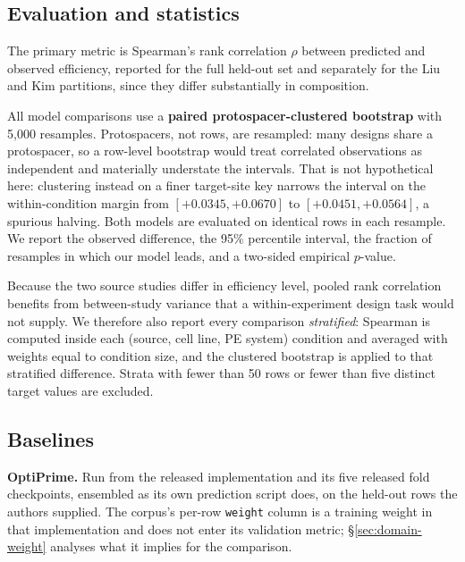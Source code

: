 \documentclass[11pt]{article}
\begin{document}
\subsection{Evaluation and statistics}

The primary metric is Spearman's rank correlation $\rho$ \citep{spearman1904} between
predicted and observed efficiency,
reported for the full held-out set and separately for the Liu and Kim partitions, since
they differ substantially in composition.

All model comparisons use a \textbf{paired protospacer-clustered bootstrap}
\citep{efron1993,cameron2008} with 5{,}000 resamples. Protospacers, not rows, are
resampled: many designs share a protospacer, so a row-level bootstrap would treat
correlated observations as independent and materially understate the intervals. That is
not hypothetical here: clustering instead on a finer target-site key narrows the
interval on the within-condition margin from $[+0.0345,+0.0670]$ to
$[+0.0451,+0.0564]$, a spurious halving. Both models are evaluated on identical rows in each resample.
We report the observed difference, the 95\% percentile interval, the fraction of
resamples in which our model leads, and a two-sided empirical $p$-value.

Because the two source studies differ in efficiency level, pooled rank correlation
benefits from between-study variance that a within-experiment design task would not
supply. We therefore also report every comparison \emph{stratified}: Spearman is
computed inside each (source, cell line, PE system) condition and averaged with weights
equal to condition size, and the clustered bootstrap is applied to that stratified
difference. Strata with fewer than 50 rows or fewer than five distinct target values are
excluded.

\subsection{Baselines}
\label{sec:baselines}

\textbf{OptiPrime.} Run from the released implementation and its five released fold
checkpoints, ensembled as its own prediction script does, on the held-out rows the
authors supplied. The corpus's per-row \texttt{weight} column is a training weight in
that implementation and does not enter its validation metric; \S\ref{sec:domain-weight}
analyses what it implies for the comparison.
\end{document}
